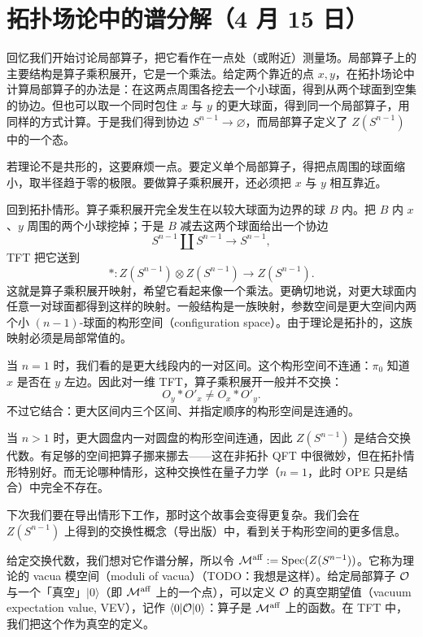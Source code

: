 \section[拓扑场论中的谱分解]{拓扑场论中的谱分解（4 月 15 日）}


回忆我们开始讨论局部算子，把它看作在一点处（或附近）测量场。局部算子上的主要结构是算子乘积展开，它是一个乘法。给定两个靠近的点 $x,y$，在拓扑场论中计算局部算子的办法是：在这两点周围各挖去一个小球面，得到从两个球面到空集的协边。但也可以取一个同时包住 $x$ 与 $y$ 的更大球面，得到同一个局部算子，用同样的方式计算。于是我们得到协边 $S^{n-1}\to\varnothing$，而局部算子定义了 $Z(S^{n-1})$ 中的一个态。

若理论不是共形的，这要麻烦一点。要定义单个局部算子，得把点周围的球面缩小，取半径趋于零的极限。要做算子乘积展开，还必须把 $x$ 与 $y$ 相互靠近。

回到拓扑情形。算子乘积展开完全发生在以较大球面为边界的球 $B$ 内。把 $B$ 内 $x$、$y$ 周围的两个小球挖掉；于是 $B$ 减去这两个球面给出一个协边
\[
S^{n-1}\amalg S^{n-1}\longrightarrow S^{n-1},
\]
TFT 把它送到
\[
*:Z(S^{n-1})\otimes Z(S^{n-1})\longrightarrow Z(S^{n-1}).
\]
这就是算子乘积展开映射，希望它看起来像一个乘法。更确切地说，对更大球面内任意一对球面都得到这样的映射。一般结构是一族映射，参数空间是更大空间内两个小 $(n-1)$-球面的构形空间（configuration space）。由于理论是拓扑的，这族映射必须是局部常值的。

\begin{example}
当 $n=1$ 时，我们看的是更大线段内的一对区间。这个构形空间不连通：$\pi_0$ 知道 $x$ 是否在 $y$ 左边。因此对一维 TFT，算子乘积展开一般并不交换：
\[
O_y*O'_x\neq O_x*O'_y .
\]
不过它结合：更大区间内三个区间、并指定顺序的构形空间是连通的。
\end{example}

当 $n>1$ 时，更大圆盘内一对圆盘的构形空间连通，因此 $Z(S^{n-1})$ 是结合交换代数。有足够的空间把算子挪来挪去——这在非拓扑 QFT 中很微妙，但在拓扑情形特别好。而无论哪种情形，这种交换性在量子力学（$n=1$，此时 OPE 只是结合）中完全不存在。

\begin{remark}
下次我们要在导出情形下工作，那时这个故事会变得更复杂。我们会在 $Z(S^{n-1})$ 上得到的交换性概念（导出版）中，看到关于构形空间的更多信息。
\end{remark}

给定交换代数，我们想对它作谱分解，所以令 $\mathcal{M}^{\mathrm{aff}}:=\operatorname{Spec}(Z(S^{n-1}))$。它称为理论的 vacua 模空间（moduli of vacua）（TODO：我想是这样）。给定局部算子 $\mathcal{O}$ 与一个「真空」$|0\rangle$（即 $\mathcal{M}^{\mathrm{aff}}$ 上的一个点），可以定义 $\mathcal{O}$ 的真空期望值（vacuum expectation value, VEV），记作 $\langle 0|\mathcal{O}|0\rangle$：算子是 $\mathcal{M}^{\mathrm{aff}}$ 上的函数。在 TFT 中，我们把这个作为真空的定义。

